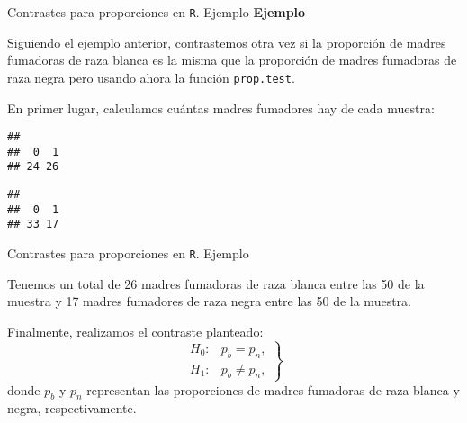 \documentclass[
  ignorenonframetext,
]{beamer}
\newenvironment{Shaded}{\begin{snugshade}}{\end{snugshade}}
\newcommand{\CommentTok}[1]{\textcolor[rgb]{0.56,0.35,0.01}{\textit{#1}}}
\newcommand{\DecValTok}[1]{\textcolor[rgb]{0.00,0.00,0.81}{#1}}
\newcommand{\KeywordTok}[1]{\textcolor[rgb]{0.13,0.29,0.53}{\textbf{#1}}}
\newcommand{\NormalTok}[1]{#1}
\newcommand{\OperatorTok}[1]{\textcolor[rgb]{0.81,0.36,0.00}{\textbf{#1}}}
\newcommand{\StringTok}[1]{\textcolor[rgb]{0.31,0.60,0.02}{#1}}
\begin{document}
\begin{frame}[fragile]{Contrastes para proporciones en \texttt{R}.
Ejemplo}
\protect\hypertarget{contrastes-para-proporciones-en-r.-ejemplo}{}
\textbf{Ejemplo}

Siguiendo el ejemplo anterior, contrastemos otra vez si la proporción de
madres fumadoras de raza blanca es la misma que la proporción de madres
fumadoras de raza negra pero usando ahora la función \texttt{prop.test}.

En primer lugar, calculamos cuántas madres fumadores hay de cada
muestra:

\begin{Shaded}
\end{Shaded}

\begin{verbatim}
## 
##  0  1 
## 24 26
\end{verbatim}

\begin{Shaded}
\end{Shaded}

\begin{verbatim}
## 
##  0  1 
## 33 17
\end{verbatim}
\end{frame}

\begin{frame}[fragile]{Contrastes para proporciones en \texttt{R}.
Ejemplo}
\protect\hypertarget{contrastes-para-proporciones-en-r.-ejemplo-1}{}
\begin{Shaded}
\end{Shaded}

Tenemos un total de 26 madres fumadoras de raza blanca entre las 50 de
la muestra y 17 madres fumadores de raza negra entre las 50 de la
muestra.

Finalmente, realizamos el contraste planteado: \[
\left.
\begin{array}{ll}
H_0: & p_b = p_n, \\
H_1: & p_b \neq p_n,
\end{array}
\right\}
\] donde \(p_b\) y \(p_n\) representan las proporciones de madres
fumadoras de raza blanca y negra, respectivamente.
\end{frame}
\end{document}
